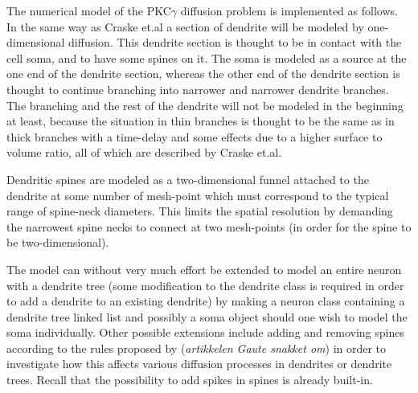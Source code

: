 The numerical model of the PKC$\gamma$ diffusion problem is implemented as follows. 
In the same way as Craske et.al \cite{craske2005spines} a section of dendrite will be modeled by one-dimensional diffusion. 
This dendrite section is thought to be in contact with the cell soma, and to have some spines on it. 
The soma is modeled as a source at the one end of the dendrite section, whereas the other end of the dendrite section is thought to continue branching into narrower and narrower dendrite branches. 
The branching and the rest of the dendrite will not be modeled in the beginning at least, because the situation in thin branches is thought to be the same as in thick branches with a time-delay and some effects due to a higher surface to volume ratio, all of which are described by Craske et.al. 

Dendritic spines are modeled as a two-dimensional funnel attached to the dendrite at some number of mesh-point which must correspond to the typical range of spine-neck diameters. 
This limits the spatial resolution by demanding the narrowest spine necks to connect at two mesh-points (in order for the spine to be two-dimensional). 

The model can without very much effort be extended to model an entire neuron with a dendrite tree (some modification to the dendrite class is required in order to add a dendrite to an existing dendrite) by making a neuron class containing a dendrite tree linked list and possibly a soma object should one wish to model the soma individually. 
Other possible extensions include adding and removing spines according to the rules proposed by (\emph{artikkelen Gaute snakket om}) in order to investigate how this affects various diffusion processes in dendrites or dendrite trees. 
Recall that the possibility to add spikes in spines is already built-in.